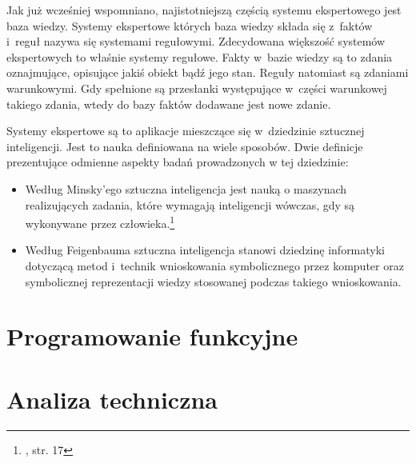 Jak już wcześniej wspomniano, najistotniejszą częścią systemu ekspertowego jest baza wiedzy. Systemy ekspertowe których baza wiedzy składa się z~faktów i~reguł nazywa się systemami regułowymi. Zdecydowana większość systemów ekspertowych to właśnie systemy regułowe. Fakty w~bazie wiedzy są to zdania oznajmujące, opisujące jakiś obiekt bądź jego stan. Reguły natomiast są zdaniami warunkowymi. Gdy spełnione są przesłanki występujące w~części warunkowej takiego zdania, wtedy do bazy faktów dodawane jest nowe zdanie.

Systemy ekspertowe są to aplikacje mieszczące się w~dziedzinie sztucznej inteligencji. Jest to nauka definiowana na wiele sposobów. Dwie definicje prezentujące odmienne aspekty badań prowadzonych w tej dziedzinie:
\begin{itemize}
	\item Według Minsky'ego sztuczna inteligencja jest nauką o maszynach realizujących zadania, które wymagają inteligencji wówczas, gdy są wykonywane przez człowieka.\footnote{\cite{mulawka}, str. 17}
	\item Według Feigenbauma sztuczna inteligencja stanowi dziedzinę informatyki dotyczącą metod i~technik wnioskowania symbolicznego przez komputer oraz symbolicznej reprezentacji wiedzy stosowanej podczas takiego wnioskowania.\footnotemark[3]
\end{itemize}


\section{Programowanie funkcyjne}

\section{Analiza techniczna}